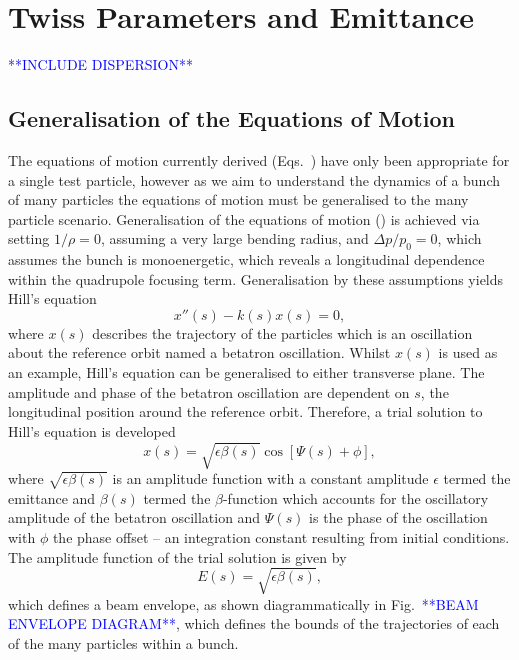 \documentclass[../main.tex]{subfiles}
\begin{document}
\section{Twiss Parameters and Emittance}
\textcolor{blue}{**INCLUDE DISPERSION**\\}

\subsection{Generalisation of the Equations of Motion}

The equations of motion currently derived (Eqs.~) have only been appropriate for a single test particle, however as we aim to understand the dynamics of a bunch of many particles the equations of motion must be generalised to the many particle scenario. Generalisation of the equations of motion () is achieved via setting $1/\rho=0$, assuming a very large bending radius, and $\Delta p/p_{0}=0$, which assumes the bunch is monoenergetic, which reveals a longitudinal dependence within the quadrupole focusing term. Generalisation by these assumptions yields Hill's equation
\begin{equation}
x''\left(s\right)-k\left(s\right)x\left(s\right) = 0,
\label{eq:Hills_equation}    
\end{equation}
where $x\left(s\right)$ describes the trajectory of the particles which is an oscillation about the reference orbit named a betatron oscillation. Whilst $x\left(s\right)$ is used as an example, Hill's equation can be generalised to either transverse plane. The amplitude and phase of the betatron oscillation are dependent on $s$, the longitudinal position around the reference orbit. Therefore, a trial solution to Hill's equation is developed 
\begin{equation}
x\left(s\right) = \sqrt{\epsilon\beta\left(s\right)}\cos\left[\Psi\left(s\right)+\phi\right],
\label{eq:Hills_trial_solution}    
\end{equation}
where $\sqrt{\epsilon\beta\left(s\right)}$ is an amplitude function with a constant amplitude $\epsilon$ termed the emittance and $\beta\left(s\right)$ termed the $\beta$-function which accounts for the oscillatory amplitude of the betatron oscillation and $\Psi\left(s\right)$ is the phase of the oscillation with $\phi$ the phase offset -- an integration constant resulting from initial conditions. The amplitude function of the trial solution is given by
\begin{equation}
E\left(s\right) = \sqrt{\epsilon\beta\left(s\right)},
\label{eq:envelope_function}    
\end{equation}
which defines a beam envelope, as shown diagrammatically in Fig.~\textcolor{blue}{**BEAM ENVELOPE DIAGRAM**}, which defines the bounds of the trajectories of each of the many particles within a bunch. 
\end{document}
